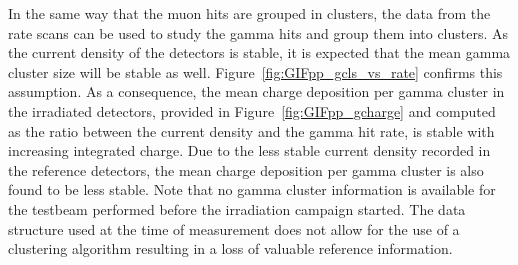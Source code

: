 	In the same way that the muon hits are grouped in clusters, the data from the rate scans can be used to study the gamma hits and group them into clusters. As the current density of the detectors is stable, it is expected that the mean gamma cluster size will be stable as well. Figure~\ref{fig:GIFpp_gcls_vs_rate} confirms this assumption. As a consequence, the mean charge deposition per gamma cluster in the irradiated detectors, provided in Figure~\ref{fig:GIFpp_gcharge} and computed as the ratio between the current density and the gamma hit rate, is stable with increasing integrated charge. Due to the less stable current density recorded in the reference detectors, the mean charge deposition per gamma cluster is also found to be less stable. Note that no gamma cluster information is available for the testbeam performed before the irradiation campaign started. The data structure used at the time of measurement does not allow for the use of a clustering algorithm resulting in a loss of valuable reference information.
	
